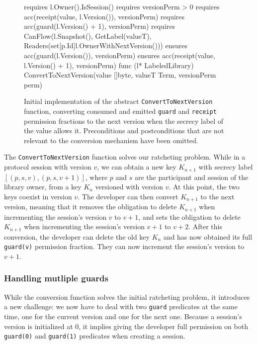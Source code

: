 \begin{figure}
    \begin{gobra}
requires l.Owner().IsSession()
requires versionPerm > 0
requires acc(receipt(value, l.Version()), versionPerm)
requires acc(guard(l.Version() + 1), versionPerm)
requires CanFlow(l.Snapshot(), GetLabel(valueT),
    Readers(set[p.Id]{l.OwnerWithNextVersion()}))
ensures  acc(guard(l.Version()), versionPerm)
ensures  acc(receipt(value, l.Version() + 1), versionPerm)
func (l* LabeledLibrary) ConvertToNextVersion(value []byte,
    valueT Term, versionPerm perm)
    \end{gobra}
    \caption{Initial implementation of the abstract \texttt{ConvertToNextVersion} function, converting consumed and emitted \texttt{guard} and \texttt{receipt} permission fractions to the next version when the secrecy label of the value allows it. Preconditions and postconditions that are not relevant to the conversion mechanism have been omitted.}
    \label{lst:convert-to-next-version}
\end{figure}

The \texttt{ConvertToNextVersion} function solves our ratcheting problem. While in a protocol session with version $v$, we can obtain a new key $K_{n+1}$ with secrecy label $[(p,s,v), (p,s,v+1)]$, where $p$ and $s$ are the participant and session of the library owner, from a key $K_n$ versioned with version $v$. At this point, the two keys coexist in version $v$. The developer can then convert $K_{n+1}$ to the next version, meaning that it removes the obligation to delete $K_{n+1}$ when incrementing the session's version $v$ to $v+1$, and sets the obligation to delete $K_{n+1}$ when incrementing the session's version $v+1$ to $v+2$. After this conversion, the developer can delete the old key $K_n$ and has now obtained its full \texttt{guard(v)} permission fraction. They can now increment the session's version to $v+1$.

\subsubsection{Handling mutliple guards}
\label{sec:handling-mutliple-guards}

While the conversion function solves the initial ratcheting problem, it introduces a new challenge: we now have to deal with two \texttt{guard} predicates at the same time, one for the current version and one for the next one.
Because a session's version is initialized at $0$, it implies giving the developer full permission on both \texttt{guard(0)} and \texttt{guard(1)} predicates when creating a session.

